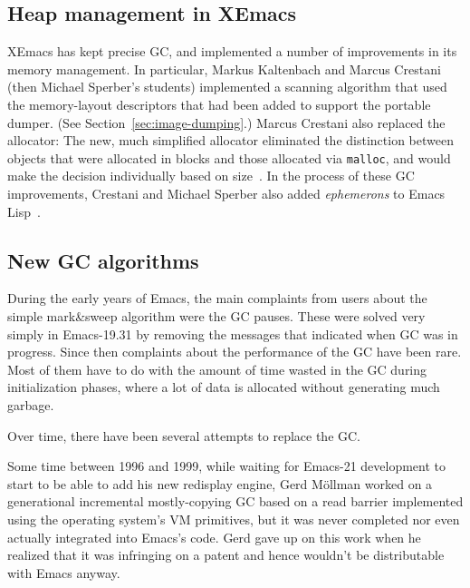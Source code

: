 \documentclass[format=acmsmall, review]{acmart}
\newcommand \Elisp {Emacs Lisp}
\begin{document}
\subsection{Heap management in XEmacs}
\label{sec:heap-xemacs}

XEmacs has kept precise GC, and implemented a number of improvements
in its memory management.  In particular, Markus Kaltenbach and Marcus
Crestani (then Michael Sperber's students)
implemented a scanning algorithm that used the memory-layout
descriptors that had been added to support the portable dumper.  (See
Section~\ref{sec:image-dumping}.)  Marcus Crestani also replaced the
allocator: The new, much simplified allocator eliminated the
distinction between objects that were allocated in blocks and those
allocated via \texttt{malloc}, and would make the decision
individually based on size~\cite{Crestani2005}.
In the process of these GC improvements, Crestani and Michael Sperber
also added \emph{ephemerons} to \Elisp{}~\cite{Hayes1997}.

\subsection{New GC algorithms}
\label{sec:gc-algorithms}

During the early years of Emacs, the main complaints from users about the
simple mark\&sweep algorithm were the GC pauses.  These were solved very
simply in Emacs-19.31 by removing the messages that indicated when GC was in
progress.  Since then complaints about the performance of the GC have been
rare.  Most of them have to do with the amount of time wasted in the
GC during initialization phases, where a lot of data is allocated without
generating much garbage.

Over time, there have been several attempts to replace the GC.

Some time between 1996 and 1999, while waiting for Emacs-21 development to
start to be able to add his new redisplay engine, Gerd
Möllman worked on a generational incremental mostly-copying GC based on
a read barrier implemented using the operating system's VM primitives, but
it was never completed nor even actually integrated into Emacs's code.
Gerd gave up on this work when he realized that it was infringing on
a patent and hence wouldn't be distributable with Emacs anyway.
\end{document}
